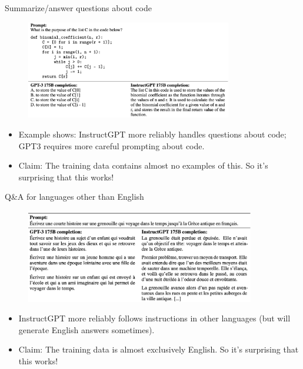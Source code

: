 \begin{vbframe}{Summarize/answer questions about code}

\vfill

\begin{figure}
\centering
\includegraphics[width = 9cm]{figure/questionsaboutcode.png}
\end{figure}

\begin{itemize}
	\item Example shows: InstructGPT more reliably handles questions
	about code;
        GPT3 requires more careful prompting
	about code.
        \item Claim: The training data contains almost no examples
	of this.
 So it's surprising that this works!
\end{itemize}

\vfill

\end{vbframe}



\begin{vbframe}{Q\&A for languages other than English}

\vfill

\begin{figure}
\centering
\includegraphics[width = 10cm]{figure/nonenglish.png}
\end{figure}

\begin{itemize}
	\item InstructGPT more reliably follows instructions
	in other languages (but will generate English
	answers sometimes).
        \item Claim: The training data is almost exclusively
	English. So it's surprising that this works!
\end{itemize}

\vfill

\end{vbframe}

